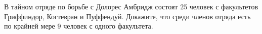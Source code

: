 \question
В тайном отряде по борьбе с Долорес Амбридж состоят 25 человек с факультетов Гриффиндор, Когтевран и Пуффендуй. Докажите, что среди членов отряда есть по крайней мере 9 человек с одного факультета.
